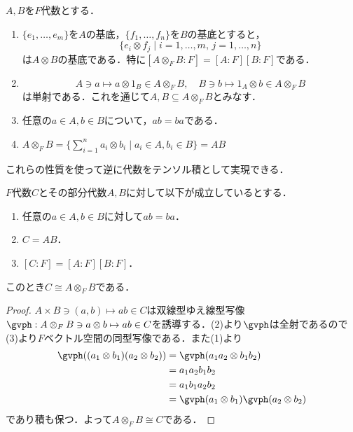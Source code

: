 \documentclass[a4paper,11pt]{jsarticle}
\begin{document}
\begin{prop}[テンソル積の性質]
  $A,B$を$F$代数とする．
  \begin{enumerate}
    \item
          $\{e_1,\ldots,e_m\}$を$A$の基底，$\{f_1,\ldots,f_n\}$を$B$の基底とすると，
          \[
            \{e_i\otimes f_j\mid i=1,\ldots,m,\,j=1,\ldots,n\}
          \]
          は$A\otimes B$の基底である．特に$[A\otimes_F B:F]=[A:F][B:F]$である．
    \item
          \[
            A\ni a\mapsto a\otimes 1_B\in A\otimes_F B,\quad B\ni b\mapsto 1_A\otimes b\in A\otimes_F B
          \]
          は単射である．これを通じて$A,B\subseteq A\otimes_F B$とみなす．
    \item 任意の$a\in A,b\in B$について，$ab=ba$である．
    \item $A\otimes_F B=\{\sum_{i=1}^n a_i\otimes b_i\mid a_i\in A,b_i\in B\}=AB$
  \end{enumerate}
\end{prop}
これらの性質を使って逆に代数をテンソル積として実現できる．
\begin{prop}[テンソル積への分解]\label{prop:tensor_product_decomposition}
  $F$代数$C$とその部分代数$A,B$に対して以下が成立しているとする．
  \begin{enumerate}
    \item 任意の$a\in A,b\in B$に対して$ab=ba$．
    \item $C=AB$．
    \item $[C:F]=[A:F][B:F]$．
  \end{enumerate}
  このとき$C\cong A\otimes_F B$である．
\end{prop}
\begin{proof}
  $A\times B\ni(a,b)\mapsto ab\in C$は双線型ゆえ線型写像$\gvph:A\otimes_F B\ni a\otimes b\mapsto ab\in C$を誘導する．(2)より$\gvph$は全射であるので(3)より$F$ベクトル空間の同型写像である．また(1)より
  \begin{align*}
    \gvph((a_1\otimes b_1)(a_2\otimes b_2)) & =\gvph(a_1a_2\otimes b_1b_2)                \\
                                            & =a_1a_2b_1b_2                               \\
                                            & =a_1b_1a_2b_2                               \\
                                            & =\gvph(a_1\otimes b_1)\gvph(a_2\otimes b_2)
  \end{align*}
  であり積も保つ．よって$A\otimes_F B\cong C$である．
\end{proof}
\end{document}
